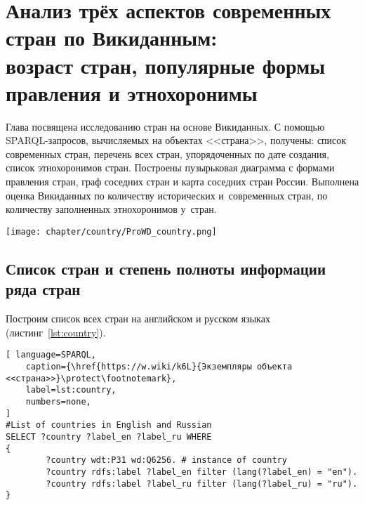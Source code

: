 \chapter[Анализ стран: возраст, формы правления и этнохоронимы]{Анализ трёх аспектов современных стран по Викиданным:\\возраст стран, популярные формы правления и этнохоронимы}
\label{ch:country}

Глава посвящена исследованию стран на основе Викиданных. 
С помощью SPARQL-запросов, вычисляемых на объектах <<страна>>, получены: 
список современных стран, перечень всех стран, упорядоченных по дате создания, 
список этнохоронимов стран. 
Построены пузырьковая диаграмма с формами правления стран, 
граф соседних стран и карта соседних стран России. 
Выполнена оценка Викиданных по количеству исторических и~современных стран, 
по количеству заполненных этнохоронимов у~стран. 

\begin{marginfigure}[7\baselineskip]
    \texttt{[image: chapter/country/ProWD\_country.png]}
    \caption[Степень заполненности свойств стран на Викиданных]%
	{%
Высокая степень заполнения по числу свойств объекта Викиданных \href{https://www.wikidata.org/wiki/Q6256}{страна (Q6256)}.  Данные получены с помощью сервиса \href{https://prowd.id/dashboards/86b6f91a8131/profile}{ProWD.id}, 2020 год. \emph{Коэффициент Джини равен 0.091.}
	}%
	\label{fig:ProWD_country}%
\end{marginfigure}


\section{Список стран и степень полноты информации ряда стран}

Построим список всех стран на английском и русском языках (листинг~\ref{lst:country}).

\begin{lstlisting}[ language=SPARQL, 
    caption={\href{https://w.wiki/k6L}{Экземпляры объекта <<страна>>}\protect\footnotemark},
    label=lst:country, 
    numbers=none,
]
#List of countries in English and Russian
SELECT ?country ?label_en ?label_ru WHERE
{
		?country wdt:P31 wd:Q6256. # instance of country
		?country rdfs:label ?label_en filter (lang(?label_en) = "en").
		?country rdfs:label ?label_ru filter (lang(?label_ru) = "ru").
}
\end{lstlisting}

